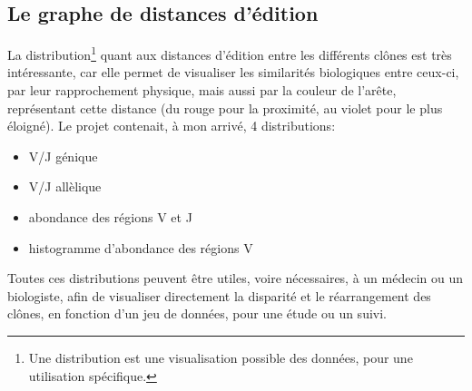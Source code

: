 \documentclass[12pt]{report}
\begin{document}
\begin{spacing}{1.2}
\chapter{Le graphe de distances d'édition}


La distribution\footnote{Une distribution est une visualisation possible des données, pour une utilisation spécifique.} quant aux distances d'édition entre les différents clônes est très intéressante, car elle permet de visualiser les similarités biologiques entre ceux-ci, par leur rapprochement physique, mais aussi par la couleur de l'arête, représentant cette distance (du rouge pour la proximité, au violet pour le plus éloigné).
\newline
Le projet contenait, à mon arrivé, 4 distributions:
\begin{itemize}
\item V/J génique
\item V/J allèlique
\item abondance des régions V et J
\item histogramme d'abondance des régions V
\end{itemize}
Toutes ces distributions peuvent être utiles, voire nécessaires, à un médecin ou un biologiste, afin de visualiser directement la disparité et le réarrangement des clônes, en fonction d'un jeu de données, pour une étude ou un suivi.


\end{spacing}
\end{document}
